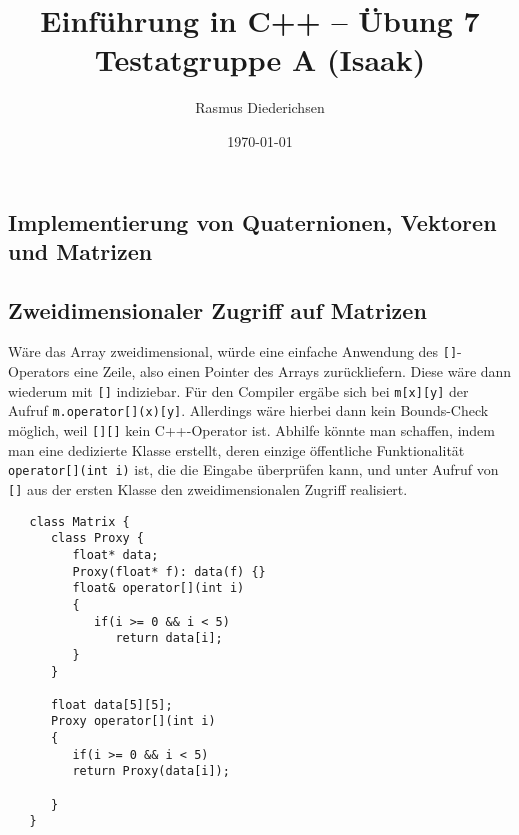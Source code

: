 \documentclass{article}
\title{Einführung in C++ -- Übung 7 \\ Testatgruppe A (Isaak)}
\author{Rasmus Diederichsen}
\date{\today}
\begin{document}
   \maketitle

   \setcounter{section}{7}

   \subsection{Implementierung von Quaternionen, Vektoren und Matrizen}

   
   
   
   
   
   
   
   \subsection{Zweidimensionaler Zugriff auf Matrizen}
   
   Wäre das Array zweidimensional, würde eine einfache Anwendung des
   \texttt{[]}-Operators eine Zeile, also einen Pointer des Arrays
   zurückliefern. Diese wäre dann wiederum mit \texttt{[]} indiziebar.  Für den
   Compiler ergäbe sich bei \texttt{m[x][y]} der Aufruf 
   \texttt{m.operator[](x)[y]}.  Allerdings wäre hierbei dann kein Bounds-Check
   möglich, weil \texttt{[][]} kein C++-Operator ist. Abhilfe könnte man
   schaffen, indem man eine dedizierte Klasse erstellt, deren einzige
   öffentliche Funktionalität \texttt{operator[](int i)} ist, die die Eingabe
   überprüfen kann, und unter Aufruf von \texttt{[]} aus der ersten Klasse den
   zweidimensionalen Zugriff realisiert.
   
   \begin{lstlisting}
   class Matrix {
      class Proxy {
         float* data;
         Proxy(float* f): data(f) {}
         float& operator[](int i) 
         {
            if(i >= 0 && i < 5)
               return data[i];
         }
      }

      float data[5][5];
      Proxy operator[](int i)
      {
         if(i >= 0 && i < 5)
         return Proxy(data[i]);
            
      }
   }
   \end{lstlisting}
\end{document}
